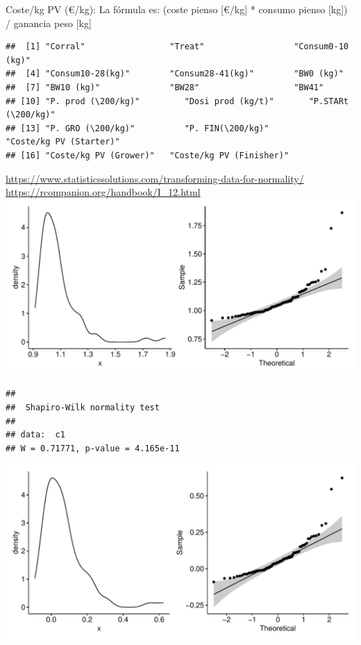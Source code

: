 \documentclass[
  11pt,
]{article}
\begin{document}
Coste/kg PV (€/kg): La fórmula es: (coste pienso {[}€/kg{]} * consumo
pienso {[}kg{]}) / ganancia peso {[}kg{]}

\begin{verbatim}
##  [1] "Corral"                 "Treat"                  "Consum0-10 (kg)"       
##  [4] "Consum10-28(kg)"        "Consum28-41(kg)"        "BW0 (kg)"              
##  [7] "BW10 (kg)"              "BW28"                   "BW41"                  
## [10] "P. prod (\200/kg)"         "Dosi prod (kg/t)"       "P.STARt (\200/kg)"        
## [13] "P. GRO (\200/kg)"          "P. FIN(\200/kg)"           "Coste/kg PV (Starter)" 
## [16] "Coste/kg PV (Grower)"   "Coste/kg PV (Finisher)"
\end{verbatim}

\url{https://www.statisticssolutions.com/transforming-data-for-normality/}
\url{https://rcompanion.org/handbook/I_12.html}
\includegraphics{def_files/figure-latex/unnamed-chunk-19-1.pdf}

\begin{verbatim}
## 
##  Shapiro-Wilk normality test
## 
## data:  c1
## W = 0.71771, p-value = 4.165e-11
\end{verbatim}

\includegraphics{def_files/figure-latex/unnamed-chunk-19-2.pdf}
\end{document}
